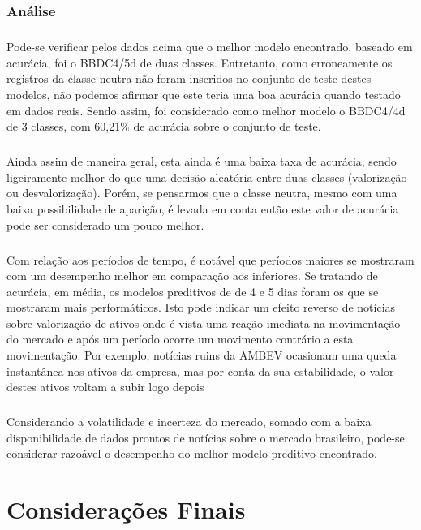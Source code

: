 \documentclass[grad,numbers]{coppe}
\begin{document}
	 			\subsection{Análise}
	 				\paragraph{}Pode-se verificar pelos dados acima que o melhor modelo encontrado, baseado em acurácia, foi o BBDC4/5d de duas classes. Entretanto, como erroneamente os registros da classe neutra não foram inseridos no conjunto de teste destes modelos, não podemos afirmar que este teria uma boa acurácia quando testado em dados reais. Sendo assim, foi considerado como melhor modelo o BBDC4/4d de 3 classes, com 60,21\% de acurácia sobre o conjunto de teste.
	 				\paragraph{}Ainda assim de maneira geral, esta ainda é uma baixa taxa de acurácia, sendo ligeiramente melhor do que uma decisão aleatória entre duas classes (valorização ou desvalorização). Porém, se pensarmos que a classe neutra, mesmo com uma baixa possibilidade de aparição, é levada em conta então este valor de acurácia pode ser considerado um pouco melhor.
	 				\paragraph{}Com relação aos períodos de tempo, é notável que períodos maiores se mostraram com um desempenho melhor em comparação aos inferiores. Se tratando de acurácia, em média, os modelos preditivos de de 4 e 5 dias foram os que se mostraram mais performáticos. Isto pode indicar um efeito reverso de notícias sobre valorização de ativos onde é vista uma reação imediata na movimentação do mercado e após um período ocorre um movimento contrário a esta movimentação. Por exemplo, notícias ruins da AMBEV ocasionam uma queda instantânea nos ativos da empresa, mas por conta da sua estabilidade, o valor destes ativos voltam a subir logo depois
	 				\paragraph{}Considerando a volatilidade e incerteza do mercado, somado com a baixa disponibilidade de dados prontos de notícias sobre o mercado brasileiro, pode-se considerar razoável o desempenho do melhor modelo preditivo encontrado.
  
  \chapter{Considerações Finais}
\end{document}
